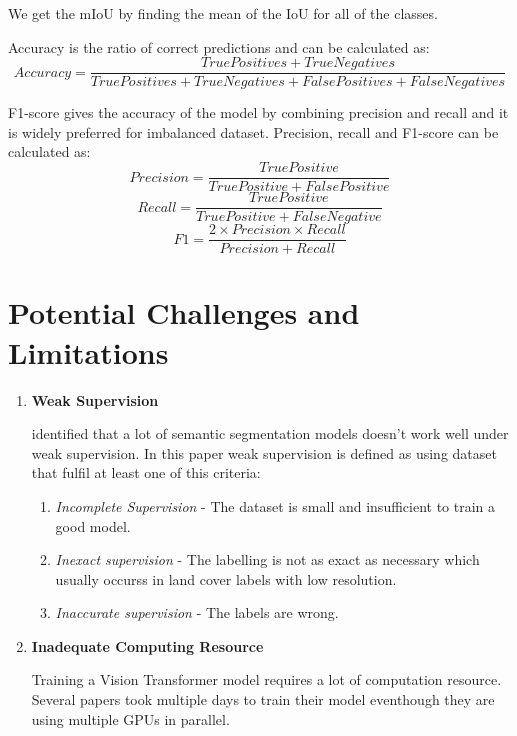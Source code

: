We get the mIoU by finding the mean of the IoU for all of the classes.

Accuracy is the ratio of correct predictions and can be calculated as:
\begin{equation}
     Accuracy = \frac{True Positives + True Negatives}{True Positives + True Negatives + False Positives + False Negatives}
 \end{equation}

 F1-score gives the accuracy of the model by combining precision and recall and it is widely preferred for imbalanced dataset. Precision, recall and F1-score can be calculated as:
 \begin{equation}
     Precision = \frac{True Positive}{True Positive + False Positive}
 \end{equation}
 \begin{equation}
     Recall = \frac{True Positive}{True Positive + False Negative}
 \end{equation}
\begin{equation}
     F1 = \frac{2 \times Precision \times Recall}{Precision + Recall}
 \end{equation}



\section{Potential Challenges and Limitations}

\begin{enumerate}
    \item \textbf{Weak Supervision}
        
        \cite{weakly-supervised-semantic} identified that a lot of semantic segmentation models doesn't work well under weak supervision. In this paper weak supervision is defined as using dataset that fulfil at least one of this criteria:
\begin{enumerate}
    \item \textit{Incomplete Supervision} - The dataset is small and insufficient to train a good model.
    \item \textit{Inexact supervision} - The labelling is not as exact as necessary which usually occurss in land cover labels with low resolution.
    \item \textit{Inaccurate supervision} - The labels are wrong.
\end{enumerate}
\item \textbf{Inadequate Computing Resource}
    
    Training a Vision Transformer model requires a lot of computation resource. Several papers took multiple days to train their model eventhough they are using multiple GPUs in parallel. 


\end{enumerate}
